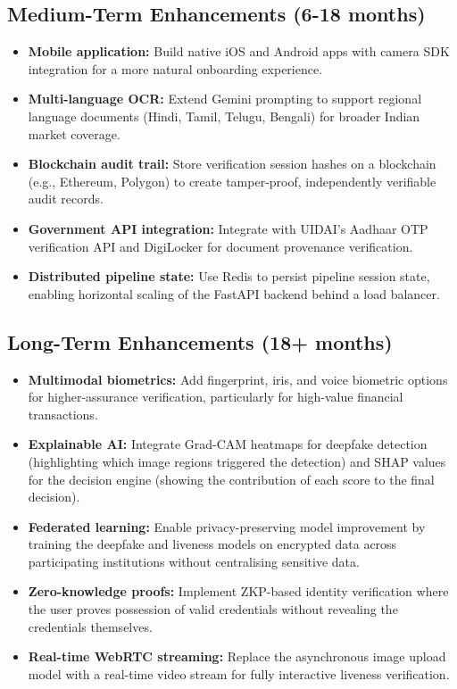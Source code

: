 \subsection{Medium-Term Enhancements (6-18 months)}
\begin{itemize}
    \item \textbf{Mobile application:} Build native iOS and Android apps with camera SDK integration for a more natural onboarding experience.
    \item \textbf{Multi-language OCR:} Extend Gemini prompting to support regional language documents (Hindi, Tamil, Telugu, Bengali) for broader Indian market coverage.
    \item \textbf{Blockchain audit trail:} Store verification session hashes on a blockchain (e.g., Ethereum, Polygon) to create tamper-proof, independently verifiable audit records.
    \item \textbf{Government API integration:} Integrate with UIDAI's Aadhaar OTP verification API and DigiLocker for document provenance verification.
    \item \textbf{Distributed pipeline state:} Use Redis to persist pipeline session state, enabling horizontal scaling of the FastAPI backend behind a load balancer.
\end{itemize}

\subsection{Long-Term Enhancements (18+ months)}
\begin{itemize}
    \item \textbf{Multimodal biometrics:} Add fingerprint, iris, and voice biometric options for higher-assurance verification, particularly for high-value financial transactions.
    \item \textbf{Explainable AI:} Integrate Grad-CAM heatmaps for deepfake detection (highlighting which image regions triggered the detection) and SHAP values for the decision engine (showing the contribution of each score to the final decision).
    \item \textbf{Federated learning:} Enable privacy-preserving model improvement by training the deepfake and liveness models on encrypted data across participating institutions without centralising sensitive data.
    \item \textbf{Zero-knowledge proofs:} Implement ZKP-based identity verification where the user proves possession of valid credentials without revealing the credentials themselves.
    \item \textbf{Real-time WebRTC streaming:} Replace the asynchronous image upload model with a real-time video stream for fully interactive liveness verification.
\end{itemize}

